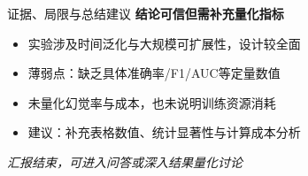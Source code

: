 \documentclass{beamer}
\begin{document}
\begin{frame}{证据、局限与总结建议}
    \textbf{结论可信但需补充量化指标}
    \begin{itemize}
        \item 实验涉及时间泛化与大规模可扩展性，设计较全面
        \item 薄弱点：缺乏具体准确率/F1/AUC等定量数值
        \item 未量化幻觉率与成本，也未说明训练资源消耗
        \item 建议：补充表格数值、统计显著性与计算成本分析
    \end{itemize}
    \vspace{1em}
    \textit{汇报结束，可进入问答或深入结果量化讨论}
\end{frame}
\end{document}
